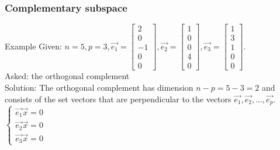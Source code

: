 \begin{frame}
	\frametitle{Complementary subspace}
	\begin{block}{Example}
		Given: $n=5,p=3, \overrightarrow{e_1}=\begin{bmatrix} 2\\0\\-1\\0\\0 \end{bmatrix}, \overrightarrow{e_2}=\begin{bmatrix} 1\\0\\0\\4\\0 \end{bmatrix}, \overrightarrow{e_3}=\begin{bmatrix} 1\\3\\1\\0\\0 \end{bmatrix}$.\\
		Asked: the orthogonal complement\\
		Solution: The orthogonal complement has dimension $n-p=5-3=2$ and consists of the set vectors that are perpendicular to the vectors $\overrightarrow{e_1},\overrightarrow{e_2},...,\overrightarrow{e_p}$.\\
		$\begin{cases}
			\overrightarrow{e_1}\overrightarrow{x}=0\\
			\overrightarrow{e_2}\overrightarrow{x}=0\\
			\overrightarrow{e_3}\overrightarrow{x}=0
		\end{cases}$
	\end{block}
\end{frame}

